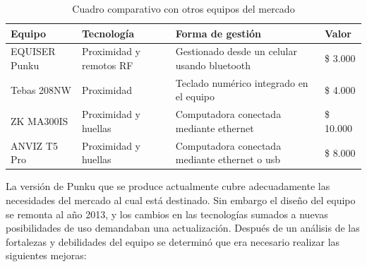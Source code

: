 \begin{table}[ht]
	\centering
	\caption{Cuadro comparativo con otros equipos del mercado}
	\begin{tabular}{C{25mm} C{25mm} C{50mm} C{20mm}}    
		\toprule
		\textbf{Equipo}  
			& \textbf{Tecnología} 
			& \textbf{Forma de gestión}
			& \textbf{Valor}  \\
		\midrule
		EQUISER \newline Punku 
			& Proximidad y remotos RF
			& Gestionado desde un \newline celular usando bluetooth
			& \$ 3.000\\
		Tebas \newline 208NW \cite{TEBAS}
			& Proximidad
			& Teclado numérico \newline integrado en el equipo
			& \$ 4.000\\
		ZK \newline MA300IS \cite{ZK}
			& Proximidad \newline y huellas
			& Computadora conectada \newline mediante ethernet
			& \$ 10.000\\
		ANVIZ \newline T5 Pro \cite{ANVIZ}
			& Proximidad \newline y huellas
			& Computadora conectada \newline mediante ethernet o usb
			& \$ 8.000\\
		\bottomrule
		
		\hline
	\end{tabular}
	\label{tab:ComparacionActual}
\end{table}

La versión de Punku que se produce actualmente cubre adecuadamente las necesidades del mercado al cual está destinado. Sin embargo el diseño del equipo se remonta al año 2013, y los cambios en las tecnologías sumados a nuevas posibilidades de uso demandaban una actualización. Después de un análisis de las fortalezas y debilidades del equipo se determinó que era necesario realizar las siguientes mejoras:  

